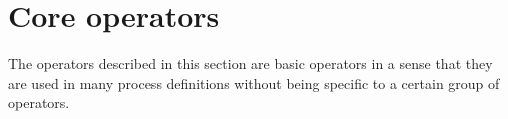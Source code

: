 \section{Core operators}

The operators described in this section are basic operators in a 
sense that they are used in many process definitions without being specific
to a certain group of operators.

